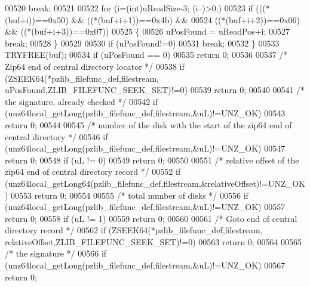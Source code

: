 \begin{DoxyCode}
00520             \textcolor{keywordflow}{break};
00521 
00522         \textcolor{keywordflow}{for} (i=(\textcolor{keywordtype}{int})uReadSize-3; (i--)>0;)
00523             \textcolor{keywordflow}{if} (((*(buf+i))==0x50) && ((*(buf+i+1))==0x4b) &&
00524                 ((*(buf+i+2))==0x06) && ((*(buf+i+3))==0x07))
00525             \{
00526                 uPosFound = uReadPos+i;
00527                 \textcolor{keywordflow}{break};
00528             \}
00529 
00530         \textcolor{keywordflow}{if} (uPosFound!=0)
00531             \textcolor{keywordflow}{break};
00532     \}
00533     TRYFREE(buf);
00534     \textcolor{keywordflow}{if} (uPosFound == 0)
00535         \textcolor{keywordflow}{return} 0;
00536 
00537     \textcolor{comment}{/* Zip64 end of central directory locator */}
00538     \textcolor{keywordflow}{if} (ZSEEK64(*pzlib\_filefunc\_def,filestream, uPosFound,ZLIB\_FILEFUNC\_SEEK\_SET)!=0)
00539         \textcolor{keywordflow}{return} 0;
00540 
00541     \textcolor{comment}{/* the signature, already checked */}
00542     \textcolor{keywordflow}{if} (unz64local\_getLong(pzlib\_filefunc\_def,filestream,&uL)!=UNZ\_OK)
00543         \textcolor{keywordflow}{return} 0;
00544 
00545     \textcolor{comment}{/* number of the disk with the start of the zip64 end of  central directory */}
00546     \textcolor{keywordflow}{if} (unz64local\_getLong(pzlib\_filefunc\_def,filestream,&uL)!=UNZ\_OK)
00547         \textcolor{keywordflow}{return} 0;
00548     \textcolor{keywordflow}{if} (uL != 0)
00549         \textcolor{keywordflow}{return} 0;
00550 
00551     \textcolor{comment}{/* relative offset of the zip64 end of central directory record */}
00552     \textcolor{keywordflow}{if} (unz64local\_getLong64(pzlib\_filefunc\_def,filestream,&relativeOffset)!=UNZ\_OK)
00553         \textcolor{keywordflow}{return} 0;
00554 
00555     \textcolor{comment}{/* total number of disks */}
00556     \textcolor{keywordflow}{if} (unz64local\_getLong(pzlib\_filefunc\_def,filestream,&uL)!=UNZ\_OK)
00557         \textcolor{keywordflow}{return} 0;
00558     \textcolor{keywordflow}{if} (uL != 1)
00559         \textcolor{keywordflow}{return} 0;
00560 
00561     \textcolor{comment}{/* Goto end of central directory record */}
00562     \textcolor{keywordflow}{if} (ZSEEK64(*pzlib\_filefunc\_def,filestream, relativeOffset,ZLIB\_FILEFUNC\_SEEK\_SET)!=0)
00563         \textcolor{keywordflow}{return} 0;
00564 
00565      \textcolor{comment}{/* the signature */}
00566     \textcolor{keywordflow}{if} (unz64local\_getLong(pzlib\_filefunc\_def,filestream,&uL)!=UNZ\_OK)
00567         \textcolor{keywordflow}{return} 0;

\end{DoxyCode}
